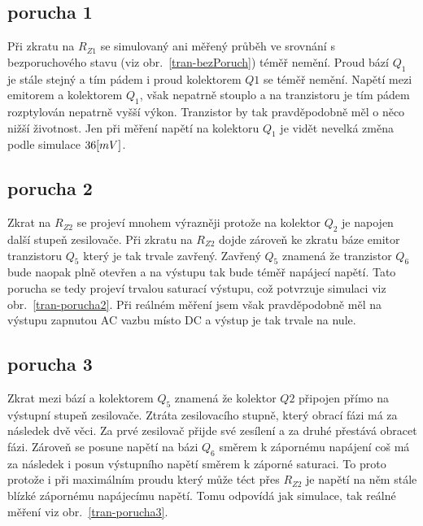 \documentclass{article}
\newcommand \obr[1]
{ obr.~\ref{#1}}
\begin{document}
\newpage
\subsection*{porucha 1}

Při zkratu na \(R_{Z1}\) se simulovaný ani měřený průběh ve srovnání s bezporuchového stavu (viz \obr{tran-bezPoruch}) téměř nemění.
Proud bází \(Q_1\) je stále stejný a tím pádem i proud kolektorem \(Q1\) se téměř nemění.
Napětí mezi emitorem a kolektorem \(Q_1\), však nepatrně stouplo a na tranzistoru je tím pádem rozptylován nepatrně vyšší výkon.
Tranzistor by tak pravděpodobně měl o něco nižší životnost.
Jen při měření napětí na kolektoru \(Q_1\) je vidět nevelká změna podle simulace \(36\-[mV]\).

\subsection*{porucha 2}

Zkrat na \(R_{Z2}\) se projeví mnohem výrazněji protože na kolektor \(Q_2\) je napojen další stupeň zesilovače.
Při zkratu na \(R_{Z2}\) dojde zároveň ke zkratu báze emitor tranzistoru \(Q_5\) který je tak trvale zavřený.
Zavřený \(Q_5\) znamená že tranzistor \(Q_6\) bude naopak plně otevřen a na výstupu tak bude téměř napájecí napětí.
Tato porucha se tedy projeví trvalou saturací výstupu, což potvrzuje simulaci viz \obr{tran-porucha2}.
Při reálném měření jsem však pravděpodobně měl na výstupu zapnutou AC vazbu místo DC a výstup je tak trvale na nule.

\subsection*{porucha 3}
 
Zkrat mezi bází a kolektorem \(Q_5\) znamená že kolektor \(Q2\) připojen přímo na výstupní stupeň zesilovače.
Ztráta zesilovacího stupně, který obrací fázi má za následek dvě věci.
Za prvé zesilovač přijde své zesílení a za druhé přestává obracet fázi.
Zároveň se posune napětí na bázi \(Q_6\) směrem k zápornému napájení coš má za následek i posun výstupního napětí směrem k záporné saturaci.
To proto protože i při maximálním proudu který může téct přes \(R_{Z2}\) je napětí na něm stále blízké zápornému napájecímu napětí. 
Tomu odpovídá jak simulace, tak reálné měření viz \obr{tran-porucha3}.
\end{document}

